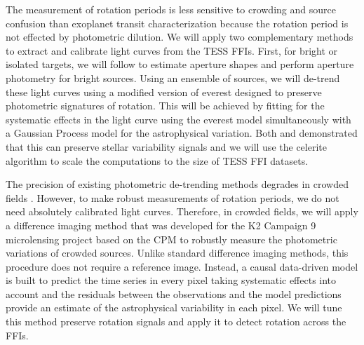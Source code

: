 \documentclass[useAMS, usenatbib, preprint, 12pt]{aastex}
\begin{document}
The measurement of rotation periods is less sensitive to crowding and source
confusion than exoplanet transit characterization because the rotation period
is not effected by photometric dilution.
We will apply two complementary methods to extract and calibrate light curves
from the TESS FFIs.
First, for bright or isolated targets, we will follow \citet{montet2017} to
estimate aperture shapes and perform aperture photometry for bright sources.
Using an ensemble of sources, we will de-trend these light curves using a
modified version of \textsf{everest} \citep{luger2016, luger2017} designed to
preserve photometric signatures of rotation.
This will be achieved by fitting for the systematic effects in the light curve
using the \textsf{everest} model simultaneously with a Gaussian Process model
for the astrophysical variation.
Both \citet{aigrain2016} and \citet{luger2016} demonstrated that this can
preserve stellar variability signals and we will use the \textsf{celerite}
algorithm \citep{dfm2017} to scale the computations to the size of TESS FFI
datasets.

The precision of existing photometric de-trending methods degrades in crowded
fields \citep[for example,][]{luger2017}.
However, to make robust measurements of rotation periods, we do not need
absolutely calibrated light curves.
Therefore, in crowded fields, we will apply a difference imaging method that
was developed for the K2 Campaign 9 microlensing project \citep{henderson2016}
based on the \textsf{CPM} \citep{wang2016} to robustly measure the photometric
variations of crowded sources.
Unlike standard difference imaging methods, this procedure does not require a
reference image.
Instead, a causal data-driven model is built to predict the time series in
every pixel taking systematic effects into account and the residuals between
the observations and the model predictions provide an estimate of the
astrophysical variability in each pixel.
We will tune this method preserve rotation signals and apply it to detect
rotation across the FFIs.
\end{document}
